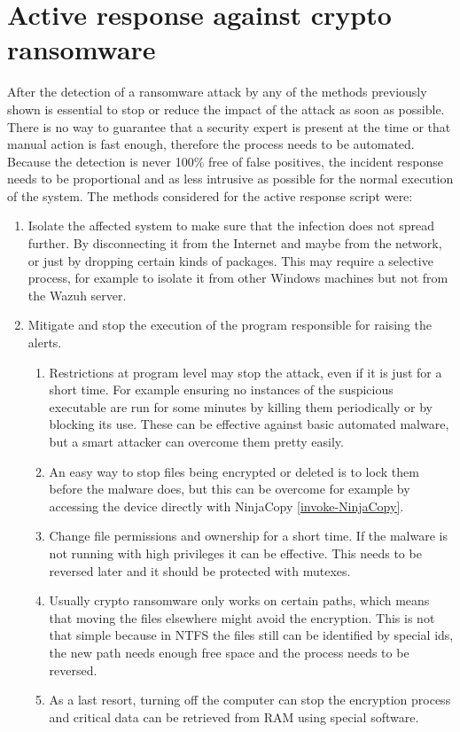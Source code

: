 \section{Active response against crypto ransomware}
After the detection of a ransomware attack by any of the methods previously shown is essential to stop or reduce the impact of the attack as soon as possible.
There is no way to guarantee that a security expert is present at the time or that manual action is fast enough, therefore the process needs to be automated.
\linej
Because the detection is never 100\% free of false positives, the incident response needs to be proportional and as less intrusive as possible for the normal execution of the system.
\linej
\linej
The methods considered for the active response script were:
\begin{enumerate}
	\item Isolate the affected system to make sure that the infection does not spread further. By disconnecting it from the Internet and maybe from the network, or just by dropping certain kinds of packages. This may require a selective process, for example to isolate it from other Windows machines but not from the Wazuh server.
	\item Mitigate and stop the execution of the program responsible for raising the alerts.
	\begin{enumerate}
		\item Restrictions at program level may stop the attack, even if it is just for a short time.
For example ensuring no instances of the suspicious executable are run for some minutes by killing them periodically or by blocking its use.
These can be effective against basic automated malware, but a smart attacker can overcome them pretty easily.
		\item An easy way to stop files being encrypted or deleted is to lock them before the malware does, but this can be overcome for example by accessing the device directly with NinjaCopy \ref{invoke-NinjaCopy}.
		\item Change file permissions and ownership for a short time. If the malware is not running with high privileges it can be effective. This needs to be reversed later and it should be protected with mutexes.
		\item Usually crypto ransomware only works on certain paths, which means that moving the files elsewhere might avoid the encryption. This is not that simple because in NTFS the files still can be identified by special ids, the new path needs enough free space and the process needs to be reversed.
		\item As a last resort, turning off the computer can stop the encryption process and critical data can be retrieved from RAM using special software.
	\end{enumerate}
\end{enumerate}
